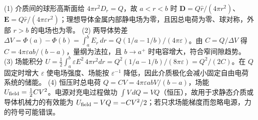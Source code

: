 (1) 介质间的球形高斯面给 \(4\pi r^2D_r=Q\)，故 \(a<r<b\) 时 \(\mathbf D=Q\hat r/(4\pi r^2)\)、\(\mathbf E=Q\hat r/(4\pi\varepsilon r^2)\)；理想导体金属内部静电场为零，且因总电荷为零、球对称，外部 \(r>b\) 的电场也为零。
(2) 两导体势差 \(\Delta V=\Phi(a)-\Phi(b)=\int_a^b E_r\,dr=Q(1/a-1/b)/(4\pi\varepsilon)\)。由 \(C=Q/\Delta V\) 得 \(C=4\pi\varepsilon ab/(b-a)\)，量纲为法拉，且 \(b\to a^+\) 时电容增大，符合窄间隙趋势。
(3) 场能积分 \(U=\frac12\int_a^b\varepsilon E^2\,4\pi r^2dr=Q^2(1/a-1/b)/(8\pi\varepsilon)=Q^2/(2C)\)。在 \(Q\) 固定时增大 \(\varepsilon\) 使电场强度、场能按 \(\varepsilon^{-1}\) 降低，因此介质极化会减小固定自由电荷系统的储能。
(4) 恒压时总电荷 \(Q=CV=4\pi\varepsilon abV/(b-a)\)，场能 \(U_{\rm field}=\frac12CV^2\)。电源对充电过程做功 \(\int V\,dQ=VQ\)（恒压），故用于求静态介质或导体机械力的有效能为 \(U_{\rm field}-VQ=-CV^2/2\)；若只求场能梯度而忽略电源，力的符号可能错误。
